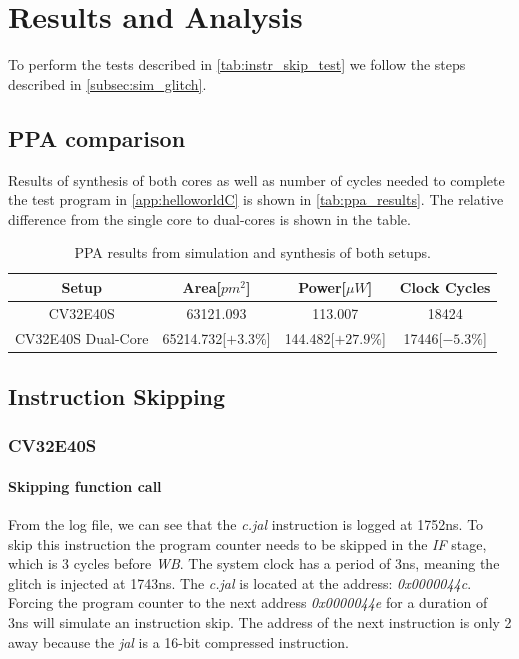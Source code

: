 \chapter{Results and Analysis}
\label{chap5}

To perform the tests described in \autoref{tab:instr_skip_test} we follow the steps described in \autoref{subsec:sim_glitch}.

\section{PPA comparison}
\label{sec:synth_comparison}

Results of synthesis of both cores as well as number of cycles needed to complete the test program in \autoref{app:helloworldC} is shown in \autoref{tab:ppa_results}. The relative difference from the single core to dual-cores is shown in the table.

\begin{table}[h]
\centering
\caption{PPA results from simulation and synthesis of both setups.}
\label{tab:ppa_results}
\begin{tabular}{c|ccc}
\toprule 
Setup & Area[$pm^2$] & Power[$\mu W$] & Clock Cycles\\
\midrule
\rowcolor{black!20} CV32E40S & 63121.093 & 113.007 & 18424\\
CV32E40S Dual-Core & 65214.732[$+3.3\%$] & 144.482[$+27.9\%$] & 17446[$-5.3\%$] \\
\bottomrule
\end{tabular}
\end{table}

\section{Instruction Skipping}
\label{sec:instr_skip_result}

\subsection{CV32E40S}
\label{subsec:single_instr_skip}

\subsubsection{Skipping function call}

 From the log file, we can see that the \textit{c.jal} instruction is logged at 1752ns. To skip this instruction the program counter needs to be skipped in the \textit{IF} stage, which is 3 cycles before \textit{WB}. The system clock has a period of 3ns, meaning the glitch is injected at 1743ns. The \textit{c.jal} is located at the address: \textit{0x0000044c}. Forcing the program counter to the next address \textit{0x0000044e} for a duration of 3ns will simulate an instruction skip. The address of the next instruction is only 2 away because the \textit{jal} is a 16-bit compressed instruction.


